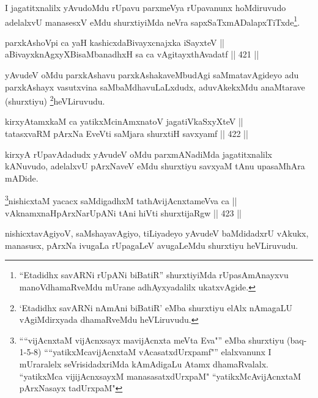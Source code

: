 \begin{artha}
I jagatitxnalilx yAvudoMdu rUpavu parxmeVya rUpavanunx hoMdiruvudo
adelalxvU manasesxV eMdu shurxtiyiMda neVra sapxSaTxmADalapxTiTxde\footnote{``Etadidhx savARNi rUpANi biBatiR'' shurxtiyiMda rUpasAmAnayxvu manoVdhamaRveMdu mUrane adhAyxyadalilx ukatxvAgide.}.
\end{artha}

\begin{shl}
parxkAshoV\s pi ca yaH kashicxdaBivayxcnajxka iSayxteV || \\
aBivayxknAgxyXBisaMbanadhxH sa ca vAgitayxthAvadatf \hfill || 421 ||  
\end{shl}

\begin{artha}
yAvudeV oMdu parxkAshavu parxkAshakaveMbudAgi saMmatavAgi\-deyo adu
parxkAshayx vasutxvina saMbaMdhavuLaLxdudx, aduvAkekxMdu anaMtarave
(shurxtiyu) \footnote{`Etadidhx savARNi nAmAni biBatiR' eMba shurxtiyu elAlx nAmagaLU
vAgiMdirxyada dhamaRveMdu heVLiruvudu.}heVLiruvudu.
\end{artha}

\begin{shl}
kirxyAtamxkaM ca yatikxMcinAmxnatoV jagatiVkaSxyXteV || \\
tatasxvaRM pArxNa EveVti saMjara shurxtiH savxyamf \hfill || 422 ||  
\end{shl}

\begin{artha}
kirxyA rUpavAdadudx yAvudeV oMdu parxmANadiMda jagatitxnalilx
kANuvudo, adelalxvU pArxNaveV eMdu shurxtiyu savxyaM tAnu upasaMhAra
mADide.
\end{artha}


\begin{shl}
\footnote{````vijAcnxtaM vijAcnxsayx mavijAcnxta meVta Eva"'' eMba shurxtiyu (baq-1-5-8) ````yatikxMcavijAcnxtaM vAcasatxdUrxpamf"'' elalxvanunx I mUraralelx seVrisidadxriMda kAmAdigaLu Atamx dhamaRvalalx. ``yatikxMca vijijAcnxsayxM manasasatxdUrxpaM" ``yatikxMcAvijAcnxtaM pArxNasayx tadUrxpaM"}nishicxtaM yacacx saMdigadhxM tathA\s vijAcnxtameVva ca || \\
vAknamxnaHpArxNarUpANi tAni hiVti shurxtijaRgw \hfill || 423 ||  
\end{shl}

\begin{artha}
nishicxtavAgiyoV, saMshayavAgiyo, tiLiyadeyo yAvudeV baMdidadxrU vAkukx, manasusx, pArxNa ivugaLa rUpagaLeV avugaLeMdu shurxtiyu heVLiruvudu.
\end{artha}

